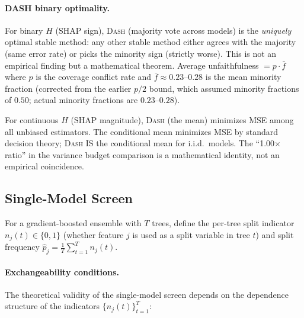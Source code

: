 \documentclass{article}
\newcommand{\DASH}{\textsc{Dash}}
\begin{document}
\paragraph{DASH binary optimality.}
For binary $H$ (SHAP sign), \DASH{} (majority vote across models) is the \emph{uniquely} optimal stable method: any other stable method either agrees with the majority (same error rate) or picks the minority sign (strictly worse). This is not an empirical finding but a mathematical theorem. Average unfaithfulness $= p \cdot \bar{f}$ where $p$ is the coverage conflict rate and $\bar{f} \approx 0.23$--$0.28$ is the mean minority fraction (corrected from the earlier $p/2$ bound, which assumed minority fractions of $0.50$; actual minority fractions are $0.23$--$0.28$).

For continuous $H$ (SHAP magnitude), \DASH{} (the mean) minimizes MSE among all unbiased estimators. The conditional mean minimizes MSE by standard decision theory; \DASH{} IS the conditional mean for i.i.d.\ models. The ``1.00$\times$ ratio'' in the variance budget comparison is a mathematical identity, not an empirical coincidence.

\subsection{Single-Model Screen}
\label{sec:f5}

\begin{sloppypar}
For a gradient-boosted ensemble with $T$ trees, define the per-tree split indicator
$n_j(t) \in \{0,1\}$ (whether feature $j$ is used as a split variable in tree $t$)
and split frequency $\hat{p}_j = \frac{1}{T}\sum_{t=1}^T n_j(t)$.
\end{sloppypar}

\paragraph{Exchangeability conditions.}
The theoretical validity of the single-model screen depends on the dependence structure of the indicators $\{n_j(t)\}_{t=1}^T$:
\end{document}

